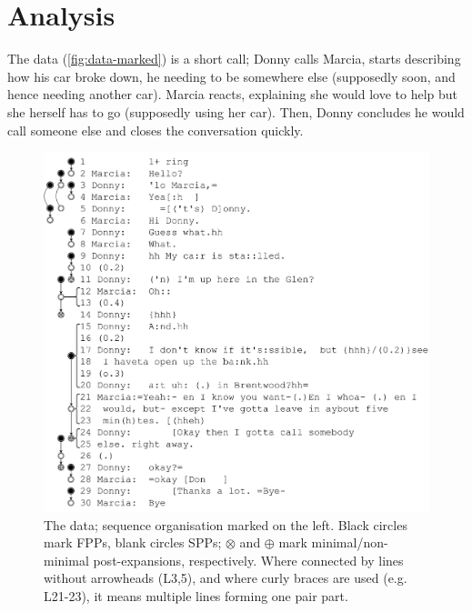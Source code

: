 \documentclass[11pt]{article}
\begin{document}
\section*{Analysis}{
	The data (\autoref{fig:data-marked}) is a short call; Donny calls Marcia, starts describing how his car broke down, he needing to be somewhere else (supposedly soon, and hence needing another car). Marcia reacts, explaining she would love to help but she herself has to go (supposedly using her car). Then, Donny concludes he would call someone else and closes the conversation quickly.

	\begin{figure}[h!tb]
		\centering
		\includegraphics[width=\columnwidth]{../data-marked.pdf}
		\caption{The data; sequence organisation marked on the left. Black circles mark FPPs, blank circles SPPs; $\boldsymbol{\mathbf{\otimes}}$ and $\boldsymbol{\mathbf{\oplus}}$ mark minimal/non-minimal post-expansions, respectively. Where connected by lines without arrowheads (L3,5), and where curly braces are used (e.g. L21-23), it means multiple lines forming one pair part.}
		\label{fig:data-marked}
	\end{figure}

}
\end{document}
